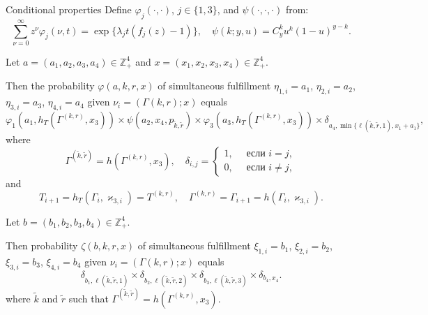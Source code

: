 \documentclass[10pt]{beamer}
\begin{document}
\begin{frame}[allowframebreaks]{Conditional properties}
Define $\varphi_j(\cdot,\cdot)$, $j\in \{1,3\}$, and $\psi(\cdot, \cdot, \cdot)$ from:
\begin{equation*}
\sum_{\nu=0}^{\infty} z^\nu\varphi_j(\nu,t) = \exp\{\lambda_j t (f_j(z)-1)\}, \quad \psi(k;y,u)=C_y^k u^k (1-u)^{y-k}.	
\end{equation*}

Let $a=(a_1, a_2, a_3, a_4) \in \mathbb{Z}_+^4$ and $x=(x_1, x_2, x_3, x_4) \in \mathbb{Z}_+^4$.

Then the probability $\varphi(a,k,r,x)$ of simultaneous fulfillment $\eta_{1,i}=a_1$, $\eta_{2,i}=a_2$, $\eta_{3,i}=a_3$, $\eta_{4,i}=a_4$ given $\nu_i=(\Gamma{(k,r)}; x)$ equals 
\begin{equation}
\!\!\varphi_1(a_1,h_T(\Gamma^{({k},{r})},x_3)) \times \psi(a_2,x_4, p_{\tilde{k},\tilde{r}}) \times \varphi_3(a_3,h_T(\Gamma^{({k},{r})},x_3))
\times \delta_{a_4,\min{\{\ell(\tilde{k},\tilde{r},1), x_1+a_1}\}},
\label{prob:1}
\end{equation}
where
\begin{equation*}
\Gamma^{(\tilde{k},\tilde{r})}=h(\Gamma^{(k,r)},x_3), \quad \delta_{i,j}=\begin{cases} 1, \quad \text{ если }i=j,\\0, \quad \text{ если } i\neq j,
\end{cases}
\end{equation*}
and
$$
T_{i+1}=h_T(\Gamma_i,\varkappa_{3,i})= T^{(k,r)},\quad  \Gamma^{(k,r)}=\Gamma_{i+1}=h(\Gamma_i,\varkappa_{3,i}).
$$
\framebreak

Let $b=(b_1, b_2, b_3, b_4) \in \mathbb{Z}_+^4$. 

Then probability $\zeta(b, k, r, x)$ of simultaneous fulfillment $\xi_{1,i}=b_1$, $\xi_{2,i}=b_2$, $\xi_{3,i}=b_3$, $\xi_{4,i}=b_4$ given $\nu_i=(\Gamma{(k,r)}; x)$ equals
\begin{equation}
\delta_{b_1,\ell(\tilde{k},\tilde{r},1)} \times \delta_{b_2,\ell(\tilde{k},\tilde{r},2)} \times 
\delta_{b_3,\ell(\tilde{k},\tilde{r},3)} \times \delta_{b_4,x_4}.
\label{prob:2}
\end{equation}
where $\tilde{k}$ and $\tilde{r}$ such that $\Gamma^{(\tilde{k},\tilde{r})}=h(\Gamma^{(k,r)},x_3)$.
\end{frame}
\end{document}
